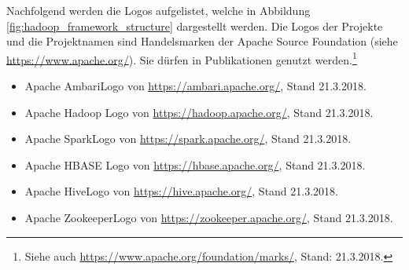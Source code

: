 \noindent
Nachfolgend werden die Logos aufgelistet, welche in Abbildung \ref{fig:hadoop_framework_structure} dargestellt werden. Die Logos der Projekte und die Projektnamen sind Handelsmarken der Apache Source Foundation (siehe \url{https://www.apache.org/}). Sie dürfen in Publikationen genutzt werden.\footnote{Siehe auch \url{https://www.apache.org/foundation/marks/}, Stand: 21.3.2018.}

\begin{itemize}
\item Apache Ambari\texttrademark\thinspace Logo von \url{https://ambari.apache.org/}, Stand 21.3.2018. 
\item Apache Hadoop\textsuperscript{\textregistered} Logo von \url{https://hadoop.apache.org/}, Stand 21.3.2018.
\item Apache Spark\texttrademark\thinspace Logo von \url{https://spark.apache.org/}, Stand 21.3.2018.
\item Apache HBASE\textsuperscript{\textregistered} Logo von \url{https://hbase.apache.org/}, Stand 21.3.2018.
\item Apache Hive\texttrademark\thinspace Logo von \url{https://hive.apache.org/}, Stand 21.3.2018.
\item Apache Zookeeper\texttrademark\thinspace Logo von \url{https://zookeeper.apache.org/}, Stand 21.3.2018.
\end{itemize}





%